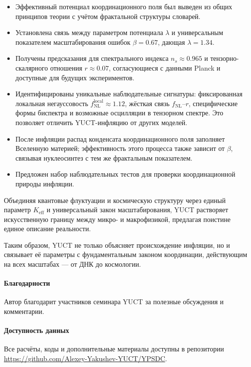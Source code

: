 \documentclass[12pt,a4paper]{article}
\theoremstyle{remark}
\begin{document}
	\begin{itemize}
		\item Эффективный потенциал координационного поля был выведен из общих принципов теории с учётом фрактальной структуры словарей.
		\item Установлена связь между параметром потенциала $\lambda$ и универсальным показателем масштабирования ошибок $\beta = 0.67$, дающая $\lambda = 1.34$.
		\item Получены предсказания для спектрального индекса $n_s \approx 0.965$ и тензорно-скалярного отношения $r \approx 0.07$, согласующиеся с данными Planck и доступные для будущих экспериментов.
		\item Идентифицированы уникальные наблюдательные сигнатуры: фиксированная локальная негауссовость $f_{\text{NL}}^{\text{local}} \approx 1.12$, жёсткая связь $f_{\text{NL}}$–$r$, специфические формы биспектра и возможные осцилляции в тензорном спектре. Это позволяет отличить YUCT-инфляцию от других моделей.
		\item После инфляции распад конденсата координационного поля заполняет Вселенную материей; эффективность этого процесса также зависит от $\beta$, связывая нуклеосинтез с тем же фрактальным показателем.
		\item Предложен набор наблюдательных тестов для проверки координационной природы инфляции.
	\end{itemize}
	
	Объединяя квантовые флуктуации и космическую структуру через единый параметр $K_{\mathrm{eff}}$ и универсальный закон масштабирования, YUCT растворяет искусственную границу между микро- и макрофизикой, предлагая поистине единое описание реальности.
	
	Таким образом, YUCT не только объясняет происхождение инфляции, но и связывает её параметры с фундаментальным законом координации, действующим на всех масштабах — от ДНК до космологии.
	
	\paragraph*{Благодарности}
	Автор благодарит участников семинара YUCT за полезные обсуждения и комментарии.
	
	\paragraph*{Доступность данных}
	Все расчёты, коды и дополнительные материалы доступны в репозитории \url{https://github.com/Alexey-Yakushev-YUCT/YPSDC}.
	
\end{document}
